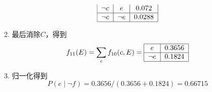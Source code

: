 \documentclass[a4paper, 11pt]{article}
\begin{document}
\begin{answer}
\begin{itemize}
\begin{enumerate}
\[{\begin{tabular}{|c|c|c|}
            $\lnot c$ & $e$ & $0.072$\\\hline
            $\lnot c$ & $\lnot e$ & $0.0288$\\\hline
        \end{tabular}}\]
        \item 最后消除$C$，得到
        \[f_{11}(E)=\sum_c f_{10}(c,E)=\text{\begin{tabular}{|c|c|}\hline
            $e$ & $0.3656$\\\hline
            $\lnot e$ & $0.1824$\\\hline
        \end{tabular}}\]
        \item 归一化得到
        \[P(e\mid\lnot f)=0.3656/(0.3656+0.1824)=0.66715\]
    \end{enumerate}
\end{itemize}
\end{answer}
\begin{flushleft}
\end{flushleft}
\end{document}
